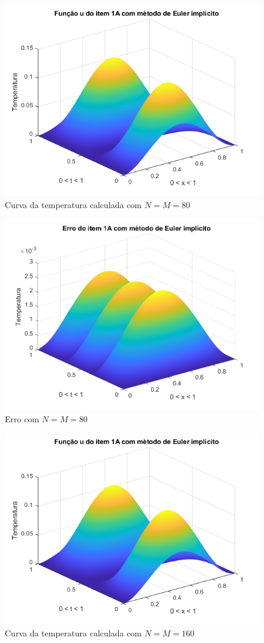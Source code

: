 \documentclass[12pt]{article}
\begin{document}
\begin{spacing}{1.5}
\begin{figure}
    \centering
    \includegraphics[width=0.8\linewidth]{Segunda_Tarefa/ItemB/nm80_calculada_A.png}
    \caption{Curva da temperatura calculada com $N=M=80$}
    \label{fig:BA_nm80_calculada}
\end{figure}

\begin{figure}
    \centering
    \includegraphics[width=0.8\linewidth]{Segunda_Tarefa/ItemB/nm80_erro_A.png}
    \caption{Erro com $N=M=80$}
    \label{fig:BA_nm80_erro}
\end{figure}

\begin{figure}
    \centering
    \includegraphics[width=0.8\linewidth]{Segunda_Tarefa/ItemB/nm160_calculada_A.png}
    \caption{Curva da temperatura calculada com $N=M=160$}
    \label{fig:BA_nm160_calculada}
\end{figure}


\end{spacing}
\end{document}

